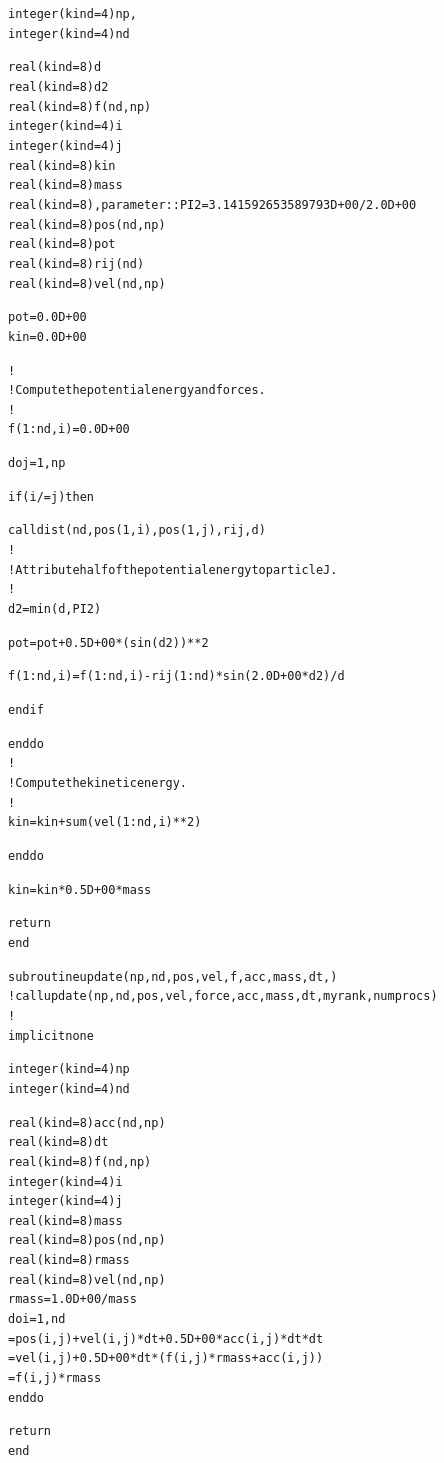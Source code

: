 \documentclass{article}
\begin{document}
{{\begin{alltt}
  integer ( kind = 4 ) np, {\color{red}{numprocs, myrank}}
  integer ( kind = 4 ) nd

  real ( kind = 8 ) d
  real ( kind = 8 ) d2
  real ( kind = 8 ) f(nd,np)
  integer ( kind = 4 ) i
  integer ( kind = 4 ) j
  real ( kind = 8 ) kin
  real ( kind = 8 ) mass
  real ( kind = 8 ), parameter :: PI2 = 3.141592653589793D+00 / 2.0D+00
  real ( kind = 8 ) pos(nd,np)
  real ( kind = 8 ) pot
  real ( kind = 8 ) rij(nd)
  real ( kind = 8 ) vel(nd,np)

  pot = 0.0D+00
  kin = 0.0D+00


 {\color{red}{ do i = myrank+1, np, numprocs}}
!
!  Compute the potential energy and forces.
!
    f(1:nd,i) = 0.0D+00

    do j = 1, np

      if ( i /= j ) then

        call dist ( nd, pos(1,i), pos(1,j), rij, d )
!
!  Attribute half of the potential energy to particle J.
!
        d2 = min ( d, PI2 )

        pot = pot + 0.5D+00 * ( sin ( d2 ) )**2

        f(1:nd,i) = f(1:nd,i) - rij(1:nd) * sin ( 2.0D+00 * d2 ) / d

      end if

    end do
!
!  Compute the kinetic energy.
!
    kin = kin + sum ( vel(1:nd,i)**2 )

  end do


  kin = kin * 0.5D+00 * mass

  return
end

subroutine update ( np, nd, {\color{red}{loc_pos, loc_vel, loc_acc,}} pos, vel, f, acc, mass, dt, {\color{red}{myrank, numprocs }})
!call update ( np, nd, pos, vel, force, acc, mass, dt, myrank, numprocs )
!
  implicit none

  integer ( kind = 4 ) np
  integer ( kind = 4 ) nd

  real ( kind = 8 ) acc(nd,np)
  real ( kind = 8 ) dt
  real ( kind = 8 ) f(nd,np)
  integer ( kind = 4 ) i
  integer ( kind = 4 ) j
  real ( kind = 8 ) mass
  real ( kind = 8 ) pos(nd,np)
  real ( kind = 8 ) rmass
  real ( kind = 8 ) vel(nd,np)
  {\color{red}{integer(kind=8) myrank, numprocs}}
  {\color{red}{real(kind=8):: loc_pos(nd,np), loc_vel(nd,np), loc_acc(nd,np)}}
  rmass = 1.0D+00 / mass
 {\color{red}{ loc_pos = 0.0d0
  loc_vel = 0.0d0
  loc_acc = 0.0d0}}
  {\color{red}{do j = myrank + 1, np, numprocs}}
    do i = 1, nd
      {\color{red}{loc_pos(i,j)}} = pos(i,j) + vel(i,j) * dt + 0.5D+00 * acc(i,j) * dt * dt
      {\color{red}{loc_vel(i,j)}} = vel(i,j) + 0.5D+00 * dt * ( f(i,j) * rmass + acc(i,j) )
      {\color{red}{loc_acc(i,j)}} = f(i,j) * rmass
    end do
  {\color{red}{end do}}

  return
end

\end{alltt}}}
\end{document}
